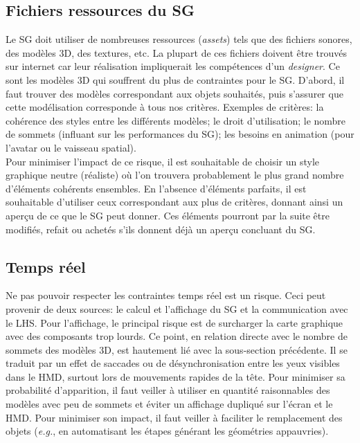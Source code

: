 	\subsection*{Fichiers ressources du SG}
		Le SG doit utiliser de nombreuses ressources (\textit{assets}) tels que des fichiers sonores, des modèles 3D, des textures, etc. La plupart de ces fichiers doivent être trouvés sur internet car leur réalisation impliquerait les compétences d'un \textit{designer}. Ce sont les modèles 3D qui souffrent du plus de contraintes pour le SG. D'abord, il faut trouver des modèles correspondant aux objets souhaités, puis s'assurer que cette modélisation corresponde à tous nos critères. Exemples de critères: la cohérence des styles entre les différents modèles; le droit d'utilisation; le nombre de sommets (influant sur les performances du SG); les besoins en animation (pour l'avatar ou le vaisseau spatial).
		\\
		
		Pour minimiser l'impact de ce risque, il est souhaitable de choisir un style graphique neutre (réaliste) où l'on trouvera probablement le plus grand nombre d'éléments cohérents ensembles. En l'absence d'éléments parfaits, il est souhaitable d'utiliser ceux correspondant aux plus de critères, donnant ainsi un aperçu de ce que le SG peut donner. Ces éléments pourront par la suite être modifiés, refait ou achetés s'ils donnent déjà un aperçu concluant du SG.
	\subsection*{Temps réel}
		Ne pas pouvoir respecter les contraintes temps réel est un risque. Ceci peut provenir de deux sources: le calcul et l'affichage du SG et la communication avec le LHS.
		Pour l'affichage, le principal risque est de surcharger la carte graphique avec des composants trop lourds. Ce point, en relation directe avec le nombre de sommets des modèles 3D, est hautement lié avec la sous-section précédente. Il se traduit par un effet de saccades ou de désynchronisation entre les yeux visibles dans le HMD, surtout lors de mouvements rapides de la tête. Pour minimiser sa probabilité d'apparition, il faut veiller à utiliser en quantité raisonnables des modèles avec peu de sommets et éviter un affichage dupliqué sur l'écran et le HMD. Pour minimiser son impact, il faut veiller à faciliter le remplacement des objets (\textit{e.g.}, en automatisant les étapes générant les géométries appauvries).
		\\
			

